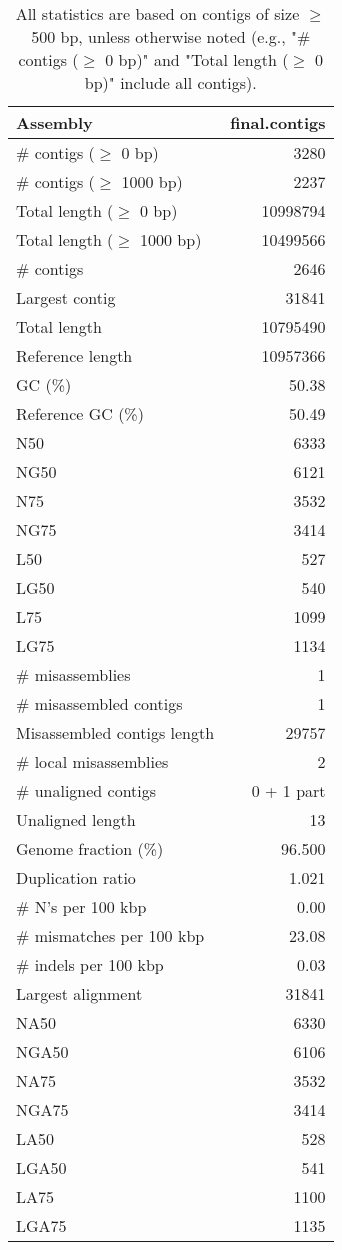 \documentclass[12pt,a4paper]{article}
\begin{document}
\begin{table}[ht]
\begin{center}
\caption{All statistics are based on contigs of size $\geq$ 500 bp, unless otherwise noted (e.g., "\# contigs ($\geq$ 0 bp)" and "Total length ($\geq$ 0 bp)" include all contigs).}
\begin{tabular}{|l*{1}{|r}|}
\hline
Assembly & final.contigs \\ \hline
\# contigs ($\geq$ 0 bp) & 3280 \\ \hline
\# contigs ($\geq$ 1000 bp) & 2237 \\ \hline
Total length ($\geq$ 0 bp) & 10998794 \\ \hline
Total length ($\geq$ 1000 bp) & 10499566 \\ \hline
\# contigs & 2646 \\ \hline
Largest contig & 31841 \\ \hline
Total length & 10795490 \\ \hline
Reference length & 10957366 \\ \hline
GC (\%) & 50.38 \\ \hline
Reference GC (\%) & 50.49 \\ \hline
N50 & 6333 \\ \hline
NG50 & 6121 \\ \hline
N75 & 3532 \\ \hline
NG75 & 3414 \\ \hline
L50 & 527 \\ \hline
LG50 & 540 \\ \hline
L75 & 1099 \\ \hline
LG75 & 1134 \\ \hline
\# misassemblies & 1 \\ \hline
\# misassembled contigs & 1 \\ \hline
Misassembled contigs length & 29757 \\ \hline
\# local misassemblies & 2 \\ \hline
\# unaligned contigs & 0 + 1 part \\ \hline
Unaligned length & 13 \\ \hline
Genome fraction (\%) & 96.500 \\ \hline
Duplication ratio & 1.021 \\ \hline
\# N's per 100 kbp & 0.00 \\ \hline
\# mismatches per 100 kbp & 23.08 \\ \hline
\# indels per 100 kbp & 0.03 \\ \hline
Largest alignment & 31841 \\ \hline
NA50 & 6330 \\ \hline
NGA50 & 6106 \\ \hline
NA75 & 3532 \\ \hline
NGA75 & 3414 \\ \hline
LA50 & 528 \\ \hline
LGA50 & 541 \\ \hline
LA75 & 1100 \\ \hline
LGA75 & 1135 \\ \hline
\end{tabular}
\end{center}
\end{table}
\end{document}

